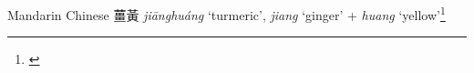 \begin{etymology}\label{ety:jianghuang}
Mandarin Chinese {薑黃} \textit{jiānghuáng} `turmeric', \textit{jiang} `ginger' + \textit{huang} `yellow'\footnote{\textcite[856]{kleeman_oxford_2010}}
\end{etymology}